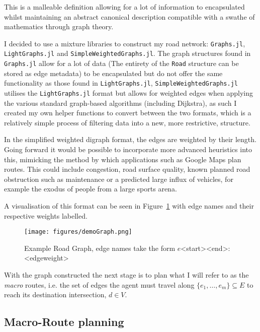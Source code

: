 This is a malleable definition allowing for a lot of information to encapsulated whilst maintaining an abstract canonical description compatible with a swathe of mathematics through graph theory.

I decided to use a mixture libraries to construct my road network: \texttt{Graphs.jl}\cite{JuliaAtticGraphsJl2021}, \texttt{LightGraphs.jl}\cite{Bromberger17}  and \texttt{SimpleWeightedGraphs.jl}\cite{JuliaGraphsSimpleWeightedGraphsJl2021}. The graph structures found in \texttt{Graphs.jl} allow for a lot of data (The entirety of the \texttt{Road} structure can be stored as edge metadata) to be encapsulated but do not offer the same functionality as those found in \texttt{LightGraphs.jl}, \texttt{SimpleWeightedGraphs.jl} utilises the \texttt{LightGraphs.jl} format but allows for weighted edges when applying the various standard graph-based algorithms (including Dijkstra), as such I created my own helper functions to convert between the two formats, which is a relatively simple process of filtering data into a new, more restrictive, structure.

In the simplified weighted digraph format, the edges are weighted by their length. Going forward it would be possible to incorporate more advanced heuristics into this, mimicking the method by which applications such as Google Maps plan routes. This could include congestion, road surface quality, known planned road obstruction such as maintenance or a predicted large influx of vehicles, for example the exodus of people from a large sports arena.

A visualisation of this format can be seen in Figure~\ref{fig:demoGraph} with edge names and their respective weights labelled.


\begin{figure}[ht]
  \centering
  \texttt{[image: figures/demoGraph.png]}
  \caption{\label{fig:demoGraph} Example Road Graph, edge names take the form $e$<start><end>: <edgeweight> }
\end{figure}


With the graph constructed the next stage is to plan what I will refer to as the \textit{macro} routes, i.e. the set of edges the agent must travel along $\{e_{1},\ldots,e_{m}\} \subseteq E$ to reach its destination intersection, $d \in V$.

\subsection{Macro-Route planning}

